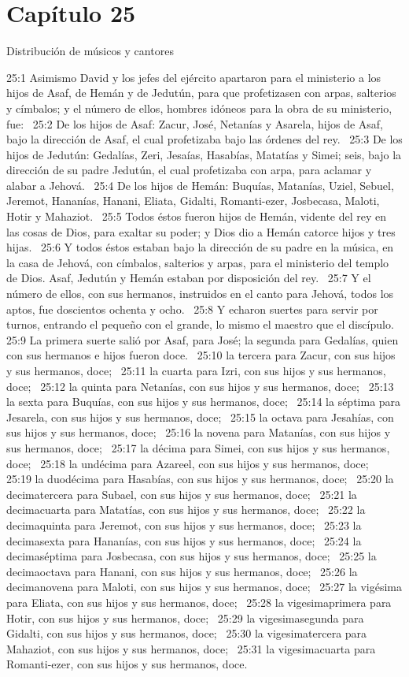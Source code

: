 \section*{Capítulo 25 }
Distribución de músicos y cantores  

25:1 Asimismo David y los jefes del ejército apartaron para el ministerio a los hijos de Asaf, de Hemán y de Jedutún, para que profetizasen con arpas, salterios y címbalos; y el número de ellos, hombres idóneos para la obra de su ministerio, fue:  
25:2 De los hijos de Asaf: Zacur, José, Netanías y Asarela, hijos de Asaf, bajo la dirección de Asaf, el cual profetizaba bajo las órdenes del rey.  
25:3 De los hijos de Jedutún: Gedalías, Zeri, Jesaías, Hasabías, Matatías y Simei; seis, bajo la dirección de su padre Jedutún, el cual profetizaba con arpa, para aclamar y alabar a Jehová.  
25:4 De los hijos de Hemán: Buquías, Matanías, Uziel, Sebuel, Jeremot, Hananías, Hanani, Eliata, Gidalti, Romanti-ezer, Josbecasa, Maloti, Hotir y Mahaziot.  
25:5 Todos éstos fueron hijos de Hemán, vidente del rey en las cosas de Dios, para exaltar su poder; y Dios dio a Hemán catorce hijos y tres hijas.  
25:6 Y todos éstos estaban bajo la dirección de su padre en la música, en la casa de Jehová, con címbalos, salterios y arpas, para el ministerio del templo de Dios. Asaf, Jedutún y Hemán estaban por disposición del rey.  
25:7 Y el número de ellos, con sus hermanos, instruidos en el canto para Jehová, todos los aptos, fue doscientos ochenta y ocho.  
25:8 Y echaron suertes para servir por turnos, entrando el pequeño con el grande, lo mismo el maestro que el discípulo.  
25:9 La primera suerte salió por Asaf, para José; la segunda para Gedalías, quien con sus hermanos e hijos fueron doce.  
25:10 la tercera para Zacur, con sus hijos y sus hermanos, doce;  
25:11 la cuarta para Izri, con sus hijos y sus hermanos, doce;  
25:12 la quinta para Netanías, con sus hijos y sus hermanos, doce;  
25:13 la sexta para Buquías, con sus hijos y sus hermanos, doce;  
25:14 la séptima para Jesarela, con sus hijos y sus hermanos, doce;  
25:15 la octava para Jesahías, con sus hijos y sus hermanos, doce;  
25:16 la novena para Matanías, con sus hijos y sus hermanos, doce;  
25:17 la décima para Simei, con sus hijos y sus hermanos, doce;  
25:18 la undécima para Azareel, con sus hijos y sus hermanos, doce;  
25:19 la duodécima para Hasabías, con sus hijos y sus hermanos, doce;  
25:20 la decimatercera para Subael, con sus hijos y sus hermanos, doce;  
25:21 la decimacuarta para Matatías, con sus hijos y sus hermanos, doce;  
25:22 la decimaquinta para Jeremot, con sus hijos y sus hermanos, doce;  
25:23 la decimasexta para Hananías, con sus hijos y sus hermanos, doce;  
25:24 la decimaséptima para Josbecasa, con sus hijos y sus hermanos, doce;  
25:25 la decimaoctava para Hanani, con sus hijos y sus hermanos, doce;  
25:26 la decimanovena para Maloti, con sus hijos y sus hermanos, doce;  
25:27 la vigésima para Eliata, con sus hijos y sus hermanos, doce;  
25:28 la vigesimaprimera para Hotir, con sus hijos y sus hermanos, doce;  
25:29 la vigesimasegunda para Gidalti, con sus hijos y sus hermanos, doce;  
25:30 la vigesimatercera para Mahaziot, con sus hijos y sus hermanos, doce;  
25:31 la vigesimacuarta para Romanti-ezer, con sus hijos y sus hermanos, doce.  
